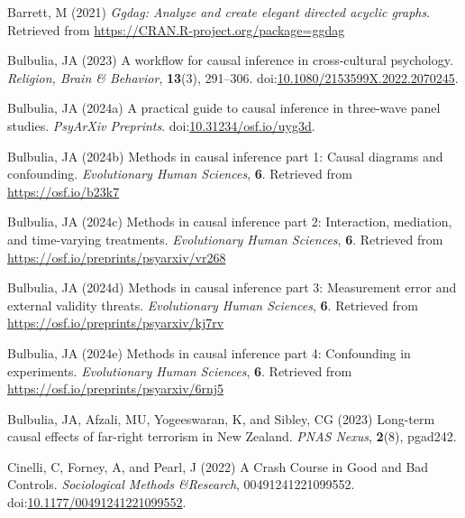 \documentclass[
  singlecolumn]{article}
\newlength{\cslhangindent}
\newenvironment{CSLReferences}[2] %
 {\begin{list}{}{%
  \setlength{\itemindent}{0pt}
  \setlength{\leftmargin}{0pt}
  \setlength{\parsep}{0pt}
  \ifodd #1
   \setlength{\leftmargin}{\cslhangindent}
   \setlength{\itemindent}{-1\cslhangindent}
  \fi
  \setlength{\itemsep}{#2\baselineskip}}}
 {\end{list}}
\begin{document}
\label{refs}
\begin{CSLReferences}{1}{0}
Barrett, M (2021) \emph{Ggdag: Analyze and create elegant directed
acyclic graphs}. Retrieved from
\url{https://CRAN.R-project.org/package=ggdag}

Bulbulia, JA (2023) A workflow for causal inference in cross-cultural
psychology. \emph{Religion, Brain \& Behavior}, \textbf{13}(3),
291--306.
doi:\href{https://doi.org/10.1080/2153599X.2022.2070245}{10.1080/2153599X.2022.2070245}.

Bulbulia, JA (2024a) A practical guide to causal inference in three-wave
panel studies. \emph{PsyArXiv Preprints}.
doi:\href{https://doi.org/10.31234/osf.io/uyg3d}{10.31234/osf.io/uyg3d}.

Bulbulia, JA (2024b) Methods in causal inference part 1: Causal diagrams
and confounding. \emph{Evolutionary Human Sciences}, \textbf{6}.
Retrieved from \url{https://osf.io/b23k7}

Bulbulia, JA (2024c) Methods in causal inference part 2: Interaction,
mediation, and time-varying treatments. \emph{Evolutionary Human
Sciences}, \textbf{6}. Retrieved from
\url{https://osf.io/preprints/psyarxiv/vr268}

Bulbulia, JA (2024d) Methods in causal inference part 3: Measurement
error and external validity threats. \emph{Evolutionary Human Sciences},
\textbf{6}. Retrieved from \url{https://osf.io/preprints/psyarxiv/kj7rv}

Bulbulia, JA (2024e) Methods in causal inference part 4: Confounding in
experiments. \emph{Evolutionary Human Sciences}, \textbf{6}. Retrieved
from \url{https://osf.io/preprints/psyarxiv/6rnj5}

Bulbulia, JA, Afzali, MU, Yogeeswaran, K, and Sibley, CG (2023)
Long-term causal effects of far-right terrorism in {N}ew {Z}ealand.
\emph{PNAS Nexus}, \textbf{2}(8), pgad242.

Cinelli, C, Forney, A, and Pearl, J (2022) A Crash Course in Good and
Bad Controls. \emph{Sociological Methods \&Research}, 00491241221099552.
doi:\href{https://doi.org/10.1177/00491241221099552}{10.1177/00491241221099552}.


\end{CSLReferences}
\end{document}
